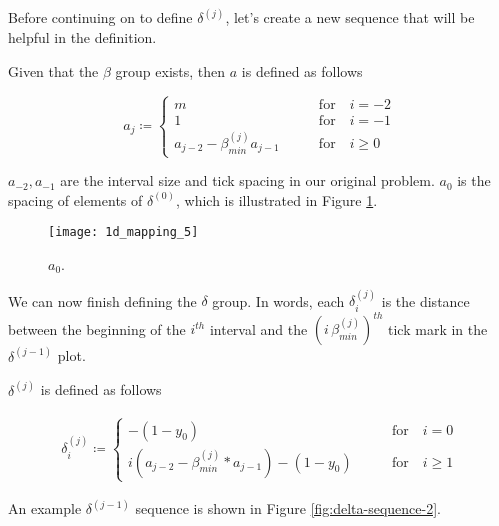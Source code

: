 Before continuing on to define $\delta^{(j)}$, let's create a new sequence that will be helpful in the definition.

\begin{definition}
  Given that the $\beta$ group exists, then $a$ is defined as follows

  \begin{equation}
    a_j \coloneqq \begin{cases}
      m \qquad &\text{for} \quad i = -2\\
      1 \qquad &\text{for} \quad i = -1\\
      a_{j-2} - \beta^{(j)}_{min} a_{j-1} \qquad &\text{for} \quad i \ge 0
    \end{cases}
  \end{equation}
\end{definition}

$a_{-2}, a_{-1}$ are the interval size and tick spacing in our original problem. $a_0$ is the spacing of elements of $\delta^{(0)}$, which is illustrated in Figure \ref{fig:a-0}.

\begin{figure}[H]
  \begin{center}
    \texttt{[image: 1d\_mapping\_5]}
  \end{center}
  \vspace{-.2in} %
  \caption{\label{fig:a-0} $a_0$.}
\end{figure}

We can now finish defining the $\delta$ group. In words, each $\delta^{(j)}_i$ is the distance between the beginning of the $i^{th}$ interval and the $(i \, \beta^{(j)}_{min})^{th}$ tick mark in the $\delta^{(j-1)}$ plot.

\begin{definition}
  $\delta^{(j)}$ is defined as follows

  \begin{align}\label{delta_beta}
    \delta^{(j)}_i \coloneqq \begin{cases}
      -(1-y_0) \qquad &\text{for} \quad i = 0\\
      i (a_{j-2} - \beta^{(j)}_{min} * a_{j-1}) - (1-y_0) \qquad &\text{for} \quad i \ge 1
    \end{cases}
  \end{align}
\end{definition}

An example $\delta^{(j-1)}$ sequence is shown in Figure \ref{fig:delta-sequence-2}.

